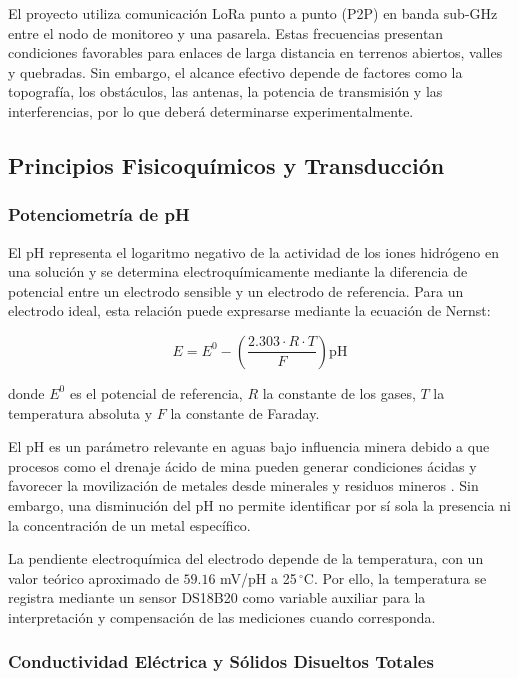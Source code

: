 \documentclass[11pt,a4paper]{article}
\begin{document}
El proyecto utiliza comunicación LoRa punto a punto (P2P) en banda sub-GHz entre el nodo de monitoreo y una pasarela. Estas frecuencias presentan condiciones favorables para enlaces de larga distancia en terrenos abiertos, valles y quebradas. Sin embargo, el alcance efectivo depende de factores como la topografía, los obstáculos, las antenas, la potencia de transmisión y las interferencias, por lo que deberá determinarse experimentalmente.

\subsection{Principios Fisicoquímicos y Transducción}

\subsubsection{Potenciometría de pH}

El pH representa el logaritmo negativo de la actividad de los iones hidrógeno en una solución y se determina electroquímicamente mediante la diferencia de potencial entre un electrodo sensible y un electrodo de referencia. Para un electrodo ideal, esta relación puede expresarse mediante la ecuación de Nernst:

\begin{equation}
    E = E^0 - \left( \frac{2.303 \cdot R \cdot T}{F} \right)\text{pH}
\end{equation}

donde $E^0$ es el potencial de referencia, $R$ la constante de los gases, $T$ la temperatura absoluta y $F$ la constante de Faraday.

El pH es un parámetro relevante en aguas bajo influencia minera debido a que procesos como el drenaje ácido de mina pueden generar condiciones ácidas y favorecer la movilización de metales desde minerales y residuos mineros \cite{usgsMineDrainage}. Sin embargo, una disminución del pH no permite identificar por sí sola la presencia ni la concentración de un metal específico.

La pendiente electroquímica del electrodo depende de la temperatura, con un valor teórico aproximado de $59.16$ mV/pH a 25\,$^{\circ}$C. Por ello, la temperatura se registra mediante un sensor DS18B20 \cite{ds18} como variable auxiliar para la interpretación y compensación de las mediciones cuando corresponda.

\subsubsection{Conductividad Eléctrica y Sólidos Disueltos Totales}
\end{document}
